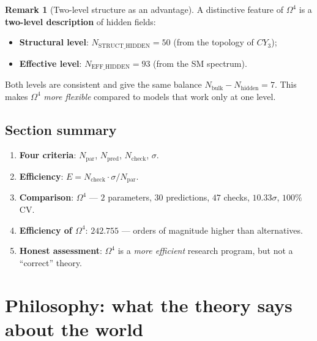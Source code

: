 \documentclass[11pt,a4paper]{article}
\newcommand{\CY}{CY_3}
\newcommand{\Om}{\Omega^4}
\theoremstyle{definition}
\newtheorem{remark}[theorem]{Remark}
\begin{document}
\begin{remark}[Two-level structure as an advantage]
\label{rem:two-levels-advantage}
A distinctive feature of $\Om$ is a \textbf{two-level description} 
of hidden fields:
\begin{itemize}
    \item \textbf{Structural level}: $N_{\text{STRUCT\_HIDDEN}} = 50$
          (from the topology of $\CY$);
    \item \textbf{Effective level}: $N_{\text{EFF\_HIDDEN}} = 93$
          (from the SM spectrum).
\end{itemize}
Both levels are consistent and give the same balance
$N_{\text{bulk}} - N_{\text{hidden}} = 7$.
This makes $\Om$ \emph{more flexible} compared to models
that work only at one level.
\end{remark}

\subsection{Section summary}
\label{subsec:benchmark-summary}

\begin{enumerate}
    \item \textbf{Four criteria}: $N_{\text{par}}$, 
          $N_{\text{pred}}$, $N_{\text{check}}$, $\sigma$.
    \item \textbf{Efficiency}: $E = N_{\text{check}} \cdot 
          \sigma / N_{\text{par}}$.
    \item \textbf{Comparison}: $\Om$ — $2$ parameters, 
          $30$ predictions, $47$ checks, $10.33\sigma$, 
          $100\%$ CV.
    \item \textbf{Efficiency of $\Om$}: $242.755$ — orders of magnitude 
          higher than alternatives.
    \item \textbf{Honest assessment}: $\Om$ is a \emph{more efficient} 
          research program, but not a ``correct'' theory.
\end{enumerate}

\section{Philosophy: what the theory says about the world}
\label{sec:philosophy}
\end{document}
